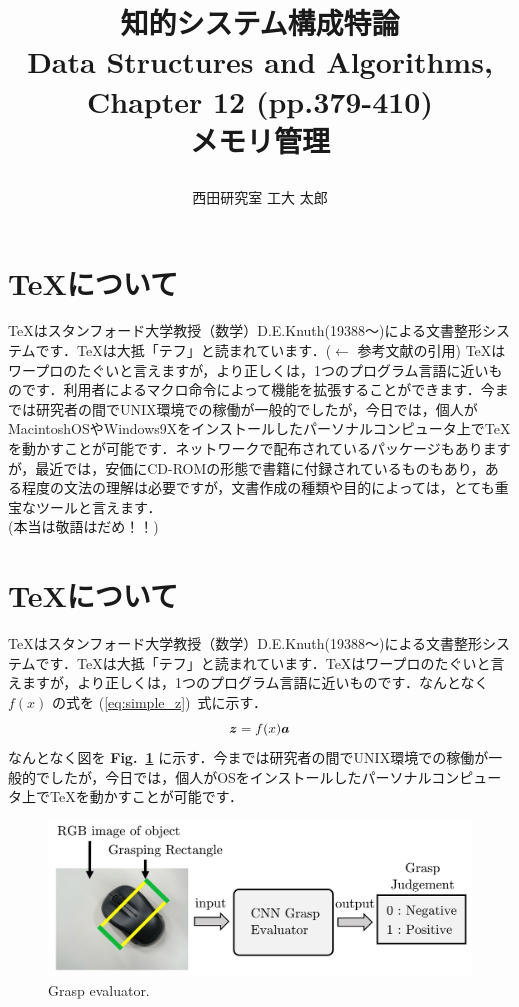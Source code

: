 \documentclass[twocolumn,10pt]{jarticle}
\title{\vspace{-20truemm}
{\normalsize \rightline{平成29年\ 5月\ 20日}}  %
{\large 知的システム構成特論\\} %
{\large Data Structures and Algorithms, %
Chapter 12 (pp.379-410)\\} %
メモリ管理 %
\date{}
\vspace{-2truemm}}
\author{西田研究室  工大 太郎} %
\begin{document}
\twocolumn[\maketitle]
\section{\TeX について}
TeXはスタンフォード大学教授（数学）D.E.Knuth(19388～)による文書整形システムです．TeXは大抵「テフ」と読まれています\cite{text_nn}．($\leftarrow$ 参考文献の引用) TeXはワープロのたぐいと言えますが，より正しくは，1つのプログラム言語に近いものです．利用者によるマクロ命令によって機能を拡張することができます．今までは研究者の間でUNIX環境での稼働が一般的でしたが，今日では，個人がMacintoshOSやWindows9Xをインストールしたパーソナルコンピュータ上でTeXを動かすことが可能です．ネットワークで配布されているパッケージもありますが，最近では，安価にCD-ROMの形態で書籍に付録されているものもあり，ある程度の文法の理解は必要ですが，文書作成の種類や目的によっては，とても重宝なツールと言えます．
\\(本当は敬語はだめ！！)
\section{\TeX について}
TeXはスタンフォード大学教授（数学）D.E.Knuth(19388～)による文書整形システムです．TeXは大抵「テフ」と読まれています．TeXはワープロのたぐいと言えますが，より正しくは，1つのプログラム言語に近いものです．なんとなく $f(x)$ の式を (\ref{eq:simple_z})~式に示す．
\begin{equation}
\mbox{\boldmath{$z$}} = f(x)\mbox{\boldmath{$a$}}
\label{eq:simple_z}
\end{equation}
なんとなく図を {\bf Fig.~\ref{fig:grasp_evaluator}} に示す．今までは研究者の間でUNIX環境での稼働が一般的でしたが，今日では，個人がOSをインストールしたパーソナルコンピュータ上でTeXを動かすことが可能です．
\vspace{10mm}
\begin{figure}[H]
\centering
  \includegraphics[scale=0.08]{../figures/evaluator.png}
\caption{Grasp evaluator.}
\label{fig:grasp_evaluator}
\end{figure}
\end{document}
